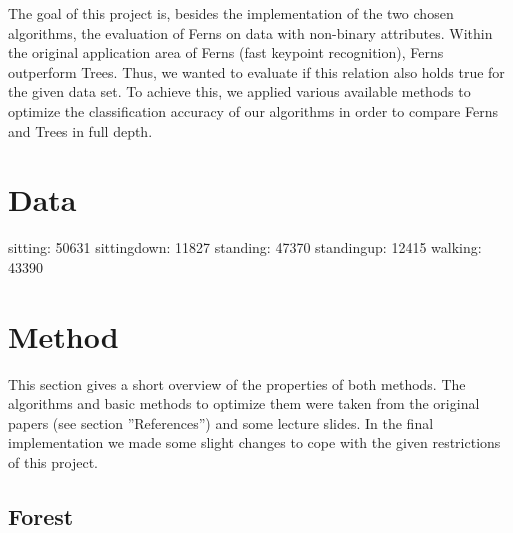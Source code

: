 \documentclass[twocolumn]{article}
\begin{document}
The goal of this project is, besides the implementation of the two chosen algorithms, the evaluation of Ferns on data with non-binary attributes. Within the original application area of Ferns (fast keypoint recognition), Ferns outperform Trees. Thus, we wanted to evaluate if this relation also holds true for the given data set. To achieve this, we applied various available methods to optimize the classification accuracy of our algorithms in order to compare Ferns and Trees in full depth.


\section{Data}
sitting: 50631
sittingdown: 11827
standing: 47370
standingup: 12415
walking: 43390



\section{Method}
This section gives a short overview of the properties of both methods. The algorithms and basic methods to optimize them were taken from the original papers (see section ''References'') and some lecture slides. In the final implementation we made some slight changes to cope with the given restrictions of this project.

\subsection{Forest}
\end{document}
